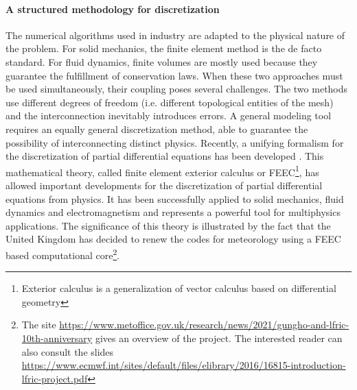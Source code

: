\documentclass[12pt]{article}
\begin{document}
	\paragraph{A structured methodology for discretization\\}
	
	The numerical algorithms used in industry are adapted to the physical nature of the problem. For solid mechanics, the finite element method is the de facto standard. For fluid dynamics, finite volumes are mostly used because they guarantee the fulfillment of conservation laws. When these two approaches must be used simultaneously, their coupling poses several challenges. The two methods use different degrees of freedom (i.e. different topological entities of the mesh) and the interconnection inevitably introduces errors. A general modeling tool requires an equally general discretization method, able to guarantee the possibility of interconnecting distinct physics. Recently, a unifying formalism for the discretization of partial differential equations has been developed \cite{arnold2006acta}. This mathematical theory, called finite element exterior calculus or FEEC\footnote{Exterior calculus is a generalization of vector calculus based on differential geometry}, has allowed important developments for the discretization of partial differential equations from physics. It has been successfully applied to solid mechanics, fluid dynamics and electromagnetism and represents a powerful tool for multiphysics applications. The significance of this theory is illustrated by the fact that the United Kingdom has decided to renew the codes for meteorology using a FEEC based computational core\footnote{The site \url{https://www.metoffice.gov.uk/research/news/2021/gungho-and-lfric-10th-anniversary} gives an overview of the project. The interested reader can also consult the slides  \url{https://www.ecmwf.int/sites/default/files/elibrary/2016/16815-introduction-lfric-project.pdf}}.
	
\end{document}

